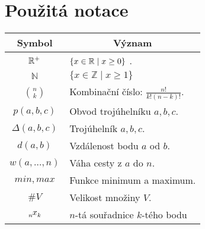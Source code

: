 \chapter*{Použitá notace}
\label{sec:notace}
\noindent
\begin{table}[h]
  \centering
  \begin{tabular}{c l}
    Symbol             & \multicolumn{1}{c}{Význam}               \\
    \toprule
    $\mathbb{R}^+$             & $\{ x \in \mathbb{R} \mid x \geq 0 \}$ .         \\
    $\mathbb{N}$ &$\{ x \in \mathbb{Z} \mid x \geq 1 \} $ \\
    $ \binom{n}{k}$    & Kombinační číslo: $\frac{n!}{k!(n-k)!}$. \\
    $ p(a, b, c)$      & Obvod trojúhelníku $a, b, c$.            \\
    $\Delta(a,b,c)$    & Trojúhelník $a, b, c$.                   \\
    $ d(a, b)$         & Vzdálenost bodu $a$ od $b$.              \\
    $ w(a, \ldots, n)$ & Váha cesty z $a$ do $n$.                 \\
    $min, max$         & Funkce minimum a maximum.                \\
    $ \#V $            & Velikost množiny $V$.                    \\
    $\x{n}{k}$         & $n$-tá souřadnice $k$-tého bodu
  \end{tabular}
\end{table}